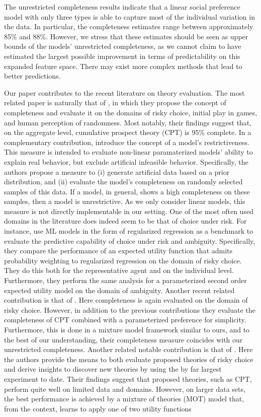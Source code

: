 \documentclass[11pt,a4paper]{article}
\theoremstyle{definition}
\begin{document}
The unrestricted completeness results indicate that a linear social preference model with only three types is able to capture most of the individual variation in the data. In particular, the completeness estimates range between approximately 85\% and 88\%. However, we stress that these estimates should be seen as upper bounds of the models' unrestricted completeness, as we cannot claim to have estimated the largest possible improvement in terms of predictability on this expanded feature space. There may exist more complex methods that lead to better predictions.

Our paper contributes to the recent literature on theory evaluation. The most related paper is naturally that of \cite{Fudenberg2021b}, in which they propose the concept of completeness and evaluate it on the domains of risky choice,  initial play in games, and human perception of randomness. Most notably, their findings suggest that, on the aggregate level, cumulative prospect theory (CPT) is 95\% complete.  In a complementary contribution, \cite{Fudenberg2021a} introduce the concept of a model's restrictiveness. This measure is intended to evaluate non-linear paramaterized models' ability to explain real behavior, but exclude artificial infeasible behavior. Specifically, the authors propose a measure to (i) generate artificial data based on a prior distribution, and (ii) evaluate the model's completeness on randomly selected samples of this data. If a model, in general, shows a high completeness on these samples, then a model is unrestrictive. As we only consider linear models, this measure is not directly implementable in our setting.  One of the most often used domains in the literature does indeed seem to be that of choice under risk. For instance, \cite{Peysakhovich2017} use ML models in the form of regularized regression as a benchmark to evaluate the predictive capability of choice under risk and ambiguity.  Specifically, they compare the performance of an expected utility function that admits probability weighting to regularized regression on the domain of risky choice. They do this both for the representative agent and on the individual level. Furthermore, they perform the same analysis for a parameterized second order expected utility model on the domain of ambiguity.  Another recent related contribution is that of \cite{Fudenberg2021c}. Here completeness is again evaluated on the domain of risky choice. However, in addition to the previous contributions they evaluate the completeness of CPT combined with a parameterized preference for simplicity. Furthermore, this is done in a mixture model framework similar to ours, and to the best of our understanding, their completeness measure coincides with our unrestricted completeness.  Another related notable contribution is that of \cite{Peterson2021}. Here the authors provide the means to both evaluate proposed theories of risky choice and derive insights to discover new theories by using the by far largest experiment to date. Their findings suggest that proposed theories, such as CPT, perform quite well on limited data and domains. However, on larger data sets, the best performance is achieved by a mixture of theories (MOT) model that, from the context, learns to apply one of two utility functions 
\end{document}

